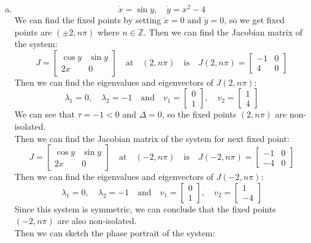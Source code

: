 \documentclass[12pt]{exam}
\begin{document}
\begin{enumerate}[(a)]
	\item \[ \dot{x} = \sin y, \quad \dot{y} = x^2-4 \]
	We can find the fixed points by setting $\dot{x} = 0$ and $\dot{y} = 0$, so we get fixed points are $(\pm 2, n\pi)$ where $n \in \mathbb{Z}$. Then we can find the Jacobian matrix of the system:
	\[ J = \begin{bmatrix}
		\cos y & \sin y \\
		2x & 0
		\end{bmatrix} \quad \text{at} \quad (2,n\pi) \quad \text{is} \quad J(2,n\pi) = \begin{bmatrix}		-1 & 0 \\
		4 & 0
		\end{bmatrix} \]
	Then we can find the eigenvalues and eigenvectors of $J(2,n\pi)$:
	\[ \lambda_1 = 0, \quad \lambda_2 = -1 \quad \text{and} \quad v_1 = \begin{bmatrix}
		0 \\
		1
	\end{bmatrix}, \quad v_2 = \begin{bmatrix}
		1 \\
		4
	\end{bmatrix} \]
	We can see that $\tau = -1<0$ and $\Delta = 0$, so the fixed points $(2,n\pi)$ are non-isolated. \\
	Then we can find the Jacobian matrix of the system for next fixed point:
	\[ J = \begin{bmatrix}
		\cos y & \sin y \\
		2x & 0
		\end{bmatrix} \quad \text{at} \quad (-2,n\pi) \quad \text{is} \quad J(-2,n\pi) = \begin{bmatrix}		-1 & 0 \\
		-4 & 0
		\end{bmatrix} \]
	Then we can find the eigenvalues and eigenvectors of $J(-2,n\pi)$:
	\[ \lambda_1 = 0, \quad \lambda_2 = -1 \quad \text{and} \quad v_1 = \begin{bmatrix}
		0 \\
		1
	\end{bmatrix}, \quad v_2 = \begin{bmatrix}
		1 \\
		-4
	\end{bmatrix} \]
	Since this system is symmetric, we can conclude that the fixed points $(-2,n\pi)$ are also non-isolated. \\
	Then we can sketch the phase portrait of the system:

\end{enumerate}
\end{document}
